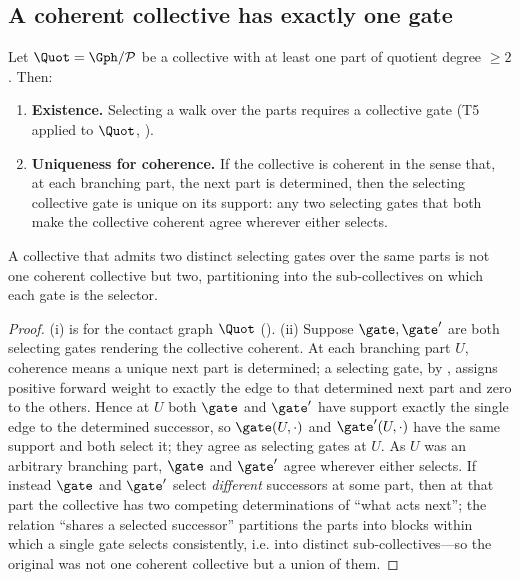 \subsection{A coherent collective has exactly one gate}

\begin{theorem}
\label{thm:single-gate}
Let $\Quot=\Gph/\mathcal{P}$ be a collective with at least one part of quotient
degree $\ge2$. Then:
\begin{enumerate}[label=\textup{(\roman*)},leftmargin=2.2em]
\item \textbf{Existence.} Selecting a walk over the parts requires a collective
gate \textup{(}T5 applied to $\Quot$, \textup{)}.
\item \textbf{Uniqueness for coherence.} If the collective is coherent in the
sense that, at each branching part, the next part is determined, then the
selecting collective gate is unique on its support: any two selecting gates that
both make the collective coherent agree wherever either selects.
\end{enumerate}
A collective that admits two distinct selecting gates over the same parts is not
one coherent collective but two, partitioning into the sub-collectives on which
each gate is the selector.
\end{theorem}

\begin{proof}
(i) is  for the contact graph $\Quot$
(). (ii) Suppose $\gate,\gate'$ are both selecting gates rendering
the collective coherent. At each branching part $U$, coherence means a unique
next part is determined; a selecting gate, by , assigns positive
forward weight to exactly the edge to that determined next part and zero to the
others. Hence at $U$ both $\gate$ and $\gate'$ have support exactly the single
edge to the determined successor, so $\gate(U,\cdot)$ and $\gate'(U,\cdot)$ have
the same support and both select it; they agree as selecting gates at $U$. As $U$
was an arbitrary branching part, $\gate$ and $\gate'$ agree wherever either
selects. If instead $\gate$ and $\gate'$ select \emph{different} successors at
some part, then at that part the collective has two competing determinations of
``what acts next''; the relation ``shares a selected successor'' partitions the
parts into blocks within which a single gate selects consistently, i.e. into
distinct sub-collectives---so the original was not one coherent collective but a
union of them.
\end{proof}

